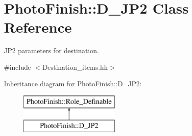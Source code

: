 \hypertarget{class_photo_finish_1_1_d___j_p2}{}\section{Photo\+Finish\+:\+:D\+\_\+\+J\+P2 Class Reference}
\label{class_photo_finish_1_1_d___j_p2}


J\+P2 parameters for destination.  




{\ttfamily \#include $<$Destination\+\_\+items.\+hh$>$}

Inheritance diagram for Photo\+Finish\+:\+:D\+\_\+\+J\+P2\+:\begin{figure}[H]
\begin{center}
\leavevmode
\includegraphics[height=2.000000cm]{class_photo_finish_1_1_d___j_p2}
\end{center}
\end{figure}

